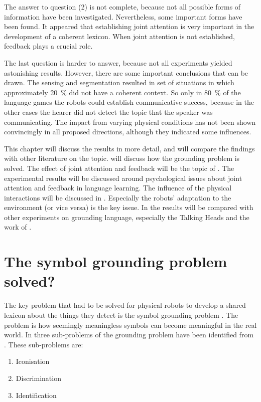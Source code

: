 The answer to question (2) is not complete, because not all possible forms of information have been investigated. Nevertheless, some important forms have been found. It appeared that establishing joint attention is very important in the development of a coherent lexicon. When joint attention is not established, feedback plays a crucial role.

The last question is harder to answer, because not all experiments yielded astonishing results. However, there are some important conclusions that can be drawn. The sensing and segmentation resulted in set of situations in which approximately 20~\% did not have a coherent context. So only in 80~\% of the language games the robots could establish communicative success, because in the other cases the hearer did not detect the topic that the speaker was communicating. The impact from varying physical conditions has not been shown convincingly in all proposed directions, although they indicated some influences.

This chapter will discuss the results in more detail, and will compare the findings with other literature on the topic.  will discuss how the grounding problem is solved. The effect of joint attention and feedback will be the topic of . The experimental results will be discussed around psychological issues about joint attention and feedback in language learning. The influence of the physical interactions will be discussed in . Especially the robots' adaptation to the environment (or vice versa) is the key issue. In  the results will be compared with other experiments on grounding language, especially the Talking Heads \citep{belpaeme:1998} and the work of \citet{billard:1997a}.

\section{The symbol grounding problem solved?}\label{s:disc:global}

The key problem that had to be solved for physical robots to develop a shared lexicon about the things they detect is the symbol grounding problem \citep{harnad:1990}. The problem is how seemingly meaningless symbols can become meaningful in the real world. In  three sub-problems of the grounding problem have been identified from \citep{harnad:1990}. These sub-problems are:

\begin{enumerate}
\item Iconisation
\item Discrimination
\item Identification
\end{enumerate}

